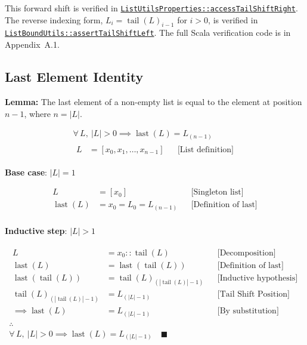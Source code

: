 This forward shift is verified in
\href{https://github.com/thiagomata/prime-numbers/blob/list-article-v1.0.0/src/main/scala/v1/chapter3/list/properties/ListUtilsProperties.scala}{\texttt{ListUtilsProperties::accessTailShiftRight}}.
The reverse indexing form, $L_i = \operatorname{tail}(L)_{i - 1}$ for
$i > 0$, is verified in
\href{https://github.com/thiagomata/prime-numbers/blob/list-article-v1.0.0/src/main/scala/v1/chapter3/list/ListBoundUtils.scala}{\texttt{ListBoundUtils::assertTailShiftLeft}}.
The full Scala verification code is in Appendix~A.1.

\subsection{Last Element Identity}

\textbf{Lemma:} The last element of a non-empty list is equal to the
element at position $n - 1$, where $n = |L|$.

\begin{gather*}
\forall\, L,\ |L| > 0 \implies \operatorname{last}(L) = L_{(n - 1)} \\
\begin{aligned}
L &= [x_0, x_1, \dots, x_{n-1}] && \text{[List definition]}
\end{aligned}
\end{gather*}

\textbf{Base case}: $|L| = 1$\par\nopagebreak

\begin{equation*}
\begin{aligned}
L &= [x_0] && \text{[Singleton list]} \\
\operatorname{last}(L) &= x_0 = L_0 = L_{(n - 1)} && \text{[Definition of last]} \\
\end{aligned}
\end{equation*}

\textbf{Inductive step}: $|L| > 1$\par\nopagebreak

\begin{gather*}
\begin{aligned}
L &= x_0 :: \operatorname{tail}(L) && \text{[Decomposition]} \\
\operatorname{last}(L) &= \operatorname{last}(\operatorname{tail}(L)) && \text{[Definition of last]} \\
\operatorname{last}(\operatorname{tail}(L)) &= \operatorname{tail}(L)_{(|\operatorname{tail}(L)| - 1)} && \text{[Inductive hypothesis]} \\
\operatorname{tail}(L)_{(|\operatorname{tail}(L)| - 1)} &= L_{(|L| - 1)} && \text{[Tail Shift Position]} \\
\implies \operatorname{last}(L) &= L_{(|L| - 1)} && \text{[By substitution]}
\end{aligned} \\
\therefore \\
\forall\, L,\ |L| > 0 \implies \operatorname{last}(L) = L_{(|L| - 1)} \quad \blacksquare
\end{gather*}

